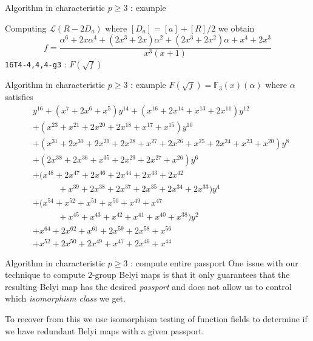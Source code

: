 \documentclass[handout,xcolor=dvipsnames]{beamer}
\theoremstyle{plain}
\newcommand{\FF}{\mathbb{F}}
\begin{document}
{\begin{frame}{Algorithm in characteristic $p\geq 3$ : example}
      \pause\par
      Computing $\mathscr{L}(R-2D_a)$ where
      $[D_a] = [a]+[R]/2$ we obtain
      \[
        f = \frac{\alpha^6 + 2x\alpha^4 + (2x^3 + 2x)\alpha^2 + (2x^3 + 2x^2)\alpha + x^4 + 2x^3}{x^3(x+1)}
      \]
      \pause
      \texttt{16T4-4,4,4-g3} : $F(\sqrt{f})$
    \end{frame}
    \begin{frame}{Algorithm in characteristic $p\geq 3$ : example}
      $F(\sqrt{f}) = \FF_3(x)(\alpha)$ where $\alpha$ satisfies
      \begin{align*}
        &y^{16} + (x^7 + 2x^6 + x^5)y^{14} + (x^{16} + 2x^{14} + x^{13} + 2x^{11})y^{12}\\
        &+ (x^{23} + x^{21} + 2x^{20} + 2x^{18} + x^{17} + x^{15})y^{10}\\
        &+ (x^{31} + 2x^{30} + 2x^{29} + 2x^{28} + x^{27} + 2x^{26} + x^{25} + 2x^{24} + x^{23} + x^{20})y^8\\
        &+ (2x^{38} + 2x^{36} + x^{35} + 2x^{29} + 2x^{27} + x^{26})y^6\\
        &+ (x^{48} + 2x^{47} + 2x^{46} + 2x^{44} + 2x^{43} + 2x^{42}\\
        &\;\;\;\;\;\;\;\;\;\;\,+x^{39} + 2x^{38} + 2x^{37} + 2x^{35} + 2x^{34} + 2x^{33})y^4\\
        &+ (x^{54} + x^{52} + x^{51} + x^{50} + x^{49} + x^{47}\\
        &\;\;\;\;\;\;\;\;\;\;\,+ x^{45} + x^{43} + x^{42} + x^{41} + x^{40} + x^{38})y^2\\
        &+ x^{64} + 2x^{62} + x^{61} + 2x^{59} + 2x^{58} + x^{56}\\
        &+ x^{52} + 2x^{50} + 2x^{49} + x^{47} + 2x^{46} + x^{44}
      \end{align*}
    \end{frame}
    \begin{frame}{Algorithm in characteristic $p\geq 3$ : compute entire passport}
      One issue with our technique
      to compute $2$-group Belyi maps
      is that it only guarantees that the
      resulting Belyi map has the desired
      \emph{passport} and does not allow us
      to control which \emph{isomorphism class} we get.
      \pause\par
      To recover from this we use isomorphism testing
      of function fields to determine if we have
      redundant Belyi maps with a given passport.
      \pause\par

\end{frame}}
\end{document}
